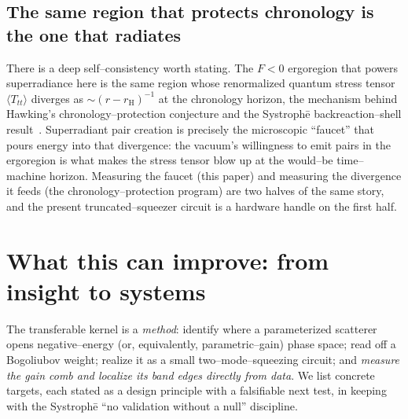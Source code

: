 \documentclass[11pt]{article}
\newcommand{\rH}{r_{\mathrm{H}}}
\begin{document}
\subsection{The same region that protects chronology is the one that radiates}
There is a deep self--consistency worth stating. The $F<0$ ergoregion that powers superradiance
here is the same region whose renormalized quantum stress tensor $\langle T_{tt}\rangle$
diverges as $\sim(r-\rH)^{-1}$ at the chronology horizon, the mechanism behind Hawking's
chronology--protection conjecture and the Systroph\=e backreaction--shell
result~\cite{hawking1992}. Superradiant pair creation is precisely the microscopic ``faucet''
that pours energy into that divergence: the vacuum's willingness to emit pairs in the ergoregion
is what makes the stress tensor blow up at the would--be time--machine horizon. Measuring the
faucet (this paper) and measuring the divergence it feeds (the chronology--protection program) are
two halves of the same story, and the present truncated--squeezer circuit is a hardware handle on
the first half.

\section{What this can improve: from insight to systems}
\label{sec:applications}

The transferable kernel is a \emph{method}: identify where a parameterized scatterer opens
negative--energy (or, equivalently, parametric--gain) phase space; read off a Bogoliubov weight;
realize it as a small two--mode--squeezing circuit; and \emph{measure the gain comb and localize
its band edges directly from data}. We list concrete targets, each stated as a design principle
with a falsifiable next test, in keeping with the Systroph\=e ``no validation without a null''
discipline.
\end{document}
